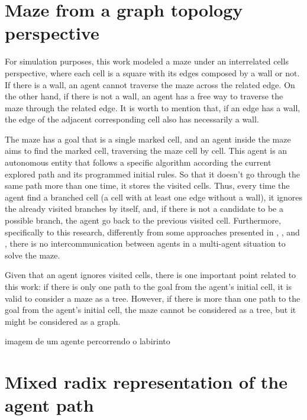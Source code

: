\section{Maze from a graph topology perspective}
\label{section_models_maze}
For simulation purposes, this work modeled a maze under an interrelated cells perspective, where each cell is a square with its edges composed by a wall or not. If there is a wall, an agent cannot traverse the maze across the related edge. On the other hand, if there is not a wall, an agent has a free way to traverse the maze through the related edge. It is worth to mention that, if an edge has a wall, the edge of the adjacent corresponding cell also has necessarily a wall.

The maze has a goal that is a single marked cell, and an agent inside the maze aims to find the marked cell, traversing the maze cell by cell. This agent is an autonomous entity that follows a specific algorithm according the current explored path and its programmed initial rules. So that it doesn't go through the same path more than one time, it stores the visited cells. Thus, every time the agent find a branched cell (a cell with at least one edge without a wall), it ignores the already visited branches by itself, and, if there is not a candidate to be a possible branch, the agent go back to the previous visited cell. Furthermore, specifically to this research, differently from some approaches presented in , , and , there is no intercommunication between agents in a multi-agent situation to solve the maze.

Given that an agent ignores visited cells, there is one important point related to this work: if there is only one path to the goal from the agent's initial cell, it is valid to consider a maze as a tree. However, if there is more than one path to the goal from the agent's initial cell, the maze cannot be considered as a tree, but it might be considered as a graph.


imagem de um agente percorrendo o labirinto

\section{Mixed radix representation of the agent path}
\label{section_models_mixed_radix}